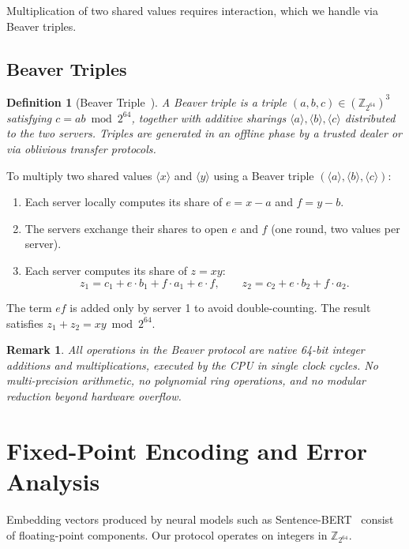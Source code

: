 \documentclass[11pt]{article}
\newtheorem{definition}[theorem]{Definition}
\newtheorem{remark}[theorem]{Remark}
\newcommand{\Z}{\mathbb{Z}}
\begin{document}
Multiplication of two shared values requires interaction, which we handle via Beaver triples.

\subsection{Beaver Triples}

\begin{definition}[Beaver Triple~\cite{beaver1991efficient}]
\label{def:beaver}
A Beaver triple is a triple $(a, b, c) \in (\Z_{2^{64}})^3$ satisfying $c = ab \bmod 2^{64}$, together with additive sharings $\langle a \rangle, \langle b \rangle, \langle c \rangle$ distributed to the two servers. Triples are generated in an offline phase by a trusted dealer or via oblivious transfer protocols.
\end{definition}

To multiply two shared values $\langle x \rangle$ and $\langle y \rangle$ using a Beaver triple $(\langle a \rangle, \langle b \rangle, \langle c \rangle)$:
\begin{enumerate}
\item Each server locally computes its share of $e = x - a$ and $f = y - b$.
\item The servers exchange their shares to open $e$ and $f$ (one round, two values per server).
\item Each server computes its share of $z = xy$:
\[
z_1 = c_1 + e \cdot b_1 + f \cdot a_1 + e \cdot f, \qquad z_2 = c_2 + e \cdot b_2 + f \cdot a_2.
\]
\end{enumerate}
The term $ef$ is added only by server 1 to avoid double-counting. The result satisfies $z_1 + z_2 = xy \bmod 2^{64}$.

\begin{remark}
All operations in the Beaver protocol are native 64-bit integer additions and multiplications, executed by the CPU in single clock cycles. No multi-precision arithmetic, no polynomial ring operations, and no modular reduction beyond hardware overflow.
\end{remark}


\section{Fixed-Point Encoding and Error Analysis}
\label{sec:encoding}

Embedding vectors produced by neural models such as Sentence-BERT~\cite{reimers2019sentence} consist of floating-point components. Our protocol operates on integers in $\Z_{2^{64}}$.
\end{document}
